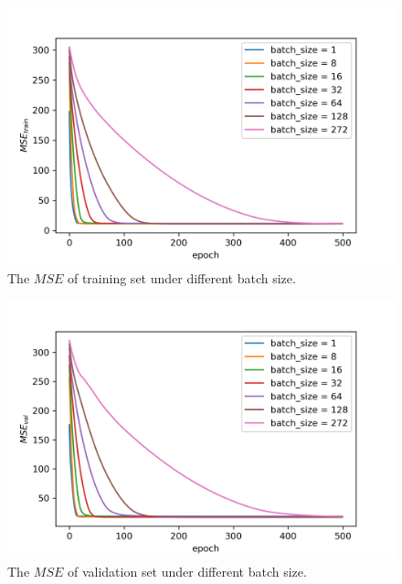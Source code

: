 \documentclass[journal, a4paper]{IEEEtran}
\begin{document}
\begin{figure}[!hbt]
	\begin{center}
		\includegraphics[width=\columnwidth]{batch_size_train}
		\caption{The $MSE$ of training set under different batch size.}
		\label{fig:batch_size_train}
	\end{center}
\end{figure} 

\begin{figure}[!hbt]
	\begin{center}
		\includegraphics[width=\columnwidth]{batch_size_val}
		\caption{The $MSE$ of validation set under different batch size.}
		\label{fig:batch_size_val}
	\end{center}
\end{figure} 
\end{document}
